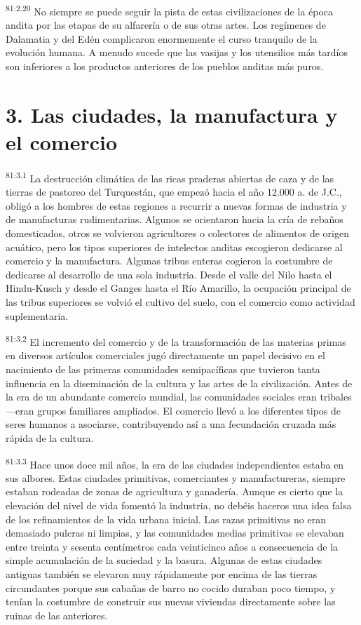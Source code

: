 \documentclass[twoside, 11pt]{book}
\begin{document}
\par
\textsuperscript{81:2.20} No siempre se puede seguir la pista de estas civilizaciones de la época andita por las etapas de su alfarería o de sus otras artes. Los regímenes de Dalamatia y del Edén complicaron enormemente el curso tranquilo de la evolución humana. A menudo sucede que las vasijas y los utensilios más tardíos son inferiores a los productos anteriores de los pueblos anditas más puros.

\section*{3. Las ciudades, la manufactura y el comercio}
\par
\textsuperscript{81:3.1} La destrucción climática de las ricas praderas abiertas de caza y de las tierras de pastoreo del Turquestán, que empezó hacia el año 12.000 a. de J.C., obligó a los hombres de estas regiones a recurrir a nuevas formas de industria y de manufacturas rudimentarias. Algunos se orientaron hacia la cría de rebaños domesticados, otros se volvieron agricultores o colectores de alimentos de origen acuático, pero los tipos superiores de intelectos anditas escogieron dedicarse al comercio y la manufactura. Algunas tribus enteras cogieron la costumbre de dedicarse al desarrollo de una sola industria. Desde el valle del Nilo hasta el Hindu-Kusch y desde el Ganges hasta el Río Amarillo, la ocupación principal de las tribus superiores se volvió el cultivo del suelo, con el comercio como actividad suplementaria.

\par
\textsuperscript{81:3.2} El incremento del comercio y de la transformación de las materias primas en diversos artículos comerciales jugó directamente un papel decisivo en el nacimiento de las primeras comunidades semipacíficas que tuvieron tanta influencia en la diseminación de la cultura y las artes de la civilización. Antes de la era de un abundante comercio mundial, las comunidades sociales eran tribales ---eran grupos familiares ampliados. El comercio llevó a los diferentes tipos de seres humanos a asociarse, contribuyendo así a una fecundación cruzada más rápida de la cultura.

\par
\textsuperscript{81:3.3} Hace unos doce mil años, la era de las ciudades independientes estaba en sus albores. Estas ciudades primitivas, comerciantes y manufactureras, siempre estaban rodeadas de zonas de agricultura y ganadería. Aunque es cierto que la elevación del nivel de vida fomentó la industria, no debéis haceros una idea falsa de los refinamientos de la vida urbana inicial. Las razas primitivas no eran demasiado pulcras ni limpias, y las comunidades medias primitivas se elevaban entre treinta y sesenta centímetros cada veinticinco años a consecuencia de la simple acumulación de la suciedad y la basura. Algunas de estas ciudades antiguas también se elevaron muy rápidamente por encima de las tierras circundantes porque sus cabañas de barro no cocido duraban poco tiempo, y tenían la costumbre de construir sus nuevas viviendas directamente sobre las ruinas de las anteriores.
\end{document}
